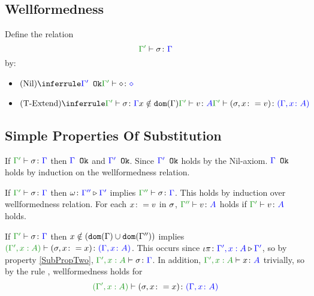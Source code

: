 \documentclass{report}
\begin{document}
\subsection{Wellformedness}
Define the relation $$\typerelation{\G'}{\si}{\G}$$ by:

\begin{itemize}
    \item $\ntreeruleI{Nil}{\ok{\G'}}{\typerelation{\G'}{\nil}{\nil}}$
    \item $\ntreeruleIII{\textend}{
        \typerelation{\G'}{\si}{\G}
        }{
        x\notin\dom{\G}
        }{
        \typerelation{\G'}{v}{A}
    }{
        \typerelation{\G'}{(\si, x \setto v)}{(\gax)}
    }$
\end{itemize}
\subsection{Simple Properties Of Substitution}

\begin{property}[Ok Relation]\label{SubPropOne}
    If $\typerelation{\G'}{\si}{\G}$ then  ${\color{blue} \Gamma} \texttt{ Ok}$ and ${\color{blue} \Gamma'} \texttt{ Ok}$. Since ${\color{blue} \Gamma'} \texttt{ Ok}$ holds by the Nil-axiom. ${\color{blue} \Gamma} \texttt{ Ok}$ holds by induction on the wellformedness relation.
\end{property}

\begin{property}[Weakening]\label{SubPropTwo}
    If $\typerelation{\G'}{\si}{\G}$ then $\omega \colon {\color{blue}\Gamma''} \triangleright {\color {blue} \Gamma'}$ implies $\typerelation{\G''}{\si}{\G}$.
    This holds by induction over wellformedness relation. For each $x\colon= v$ in $\sigma$, $\typerelation{\G''}{v}{A}$ holds if $\typerelation{\G'}{v}{A}$ holds.
\end{property}

\begin{property}[Extension]\label{SubPropThree}
    If $\typerelation{\G'}{\si}{\G}$ then $x \notin (\texttt{dom}(\Gamma) \cup \texttt{dom}(\Gamma''))$ implies $\typerelation{(\G', x: A)}{(\si, x \setto x)}{(\gax)}$.
    This occurs since $\iota\pi \colon {\color{blue}\Gamma',x: A} \triangleright {\color {blue} \Gamma'}$, so by property \ref{SubPropTwo}, 
    $\typerelation{\G', x: A}{\si}{\G}$.
    In addition, $\typerelation{\G', x: A}{x}{A}$ trivially, so by the rule \textit{\textend}, wellformedness holds for
    \begin{equation}
        \typerelation{(\G', x:A)}{(\si, x\setto x)}{(\gax)}
    \end{equation}
\end{property}

     
    
\end{document}
